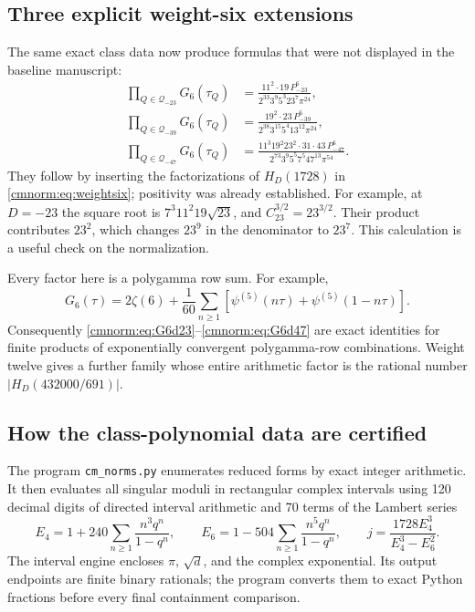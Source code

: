 \subsection{Three explicit weight-six extensions}

The same exact class data now produce formulas that were not displayed
in the baseline manuscript:
\begin{align}
 \prod_{Q\in\mathcal Q_{-23}}G_6(\tau_Q)
 &=\frac{11^2\cdot19\,P_{-23}^6}
       {2^{33}3^9 5^3 23^7\pi^{24}},\label{cmnorm:eq:G6d23}\\
 \prod_{Q\in\mathcal Q_{-39}}G_6(\tau_Q)
 &=\frac{19^2\cdot23\,P_{-39}^6}
       {2^{38}3^{15}5^4 13^{12}\pi^{24}},\label{cmnorm:eq:G6d39}\\
 \prod_{Q\in\mathcal Q_{-47}}G_6(\tau_Q)
 &=\frac{11^3 19^2 23^2\cdot31\cdot43\,P_{-47}^6}
       {2^{73}3^9 5^5 7^5 47^{13}\pi^{54}}.
       \label{cmnorm:eq:G6d47}
\end{align}
They follow by inserting the factorizations of $H_D(1728)$ in
\eqref{cmnorm:eq:weightsix}; positivity was already established.
For example, at $D=-23$ the square root is
$7^3 11^2 19\sqrt{23}$, and $C_{23}^{3/2}=23^{3/2}$.
Their product contributes $23^2$, which changes $23^9$ in the
denominator to $23^7$. This calculation is a useful check on the
normalization.

Every factor here is a polygamma row sum. For example,
\[
 G_6(\tau)=2\zeta(6)+\frac1{60}
  \sum_{n\geq1}\left[\psi^{(5)}(n\tau)
                         +\psi^{(5)}(1-n\tau)\right].
\]
Consequently \eqref{cmnorm:eq:G6d23}--\eqref{cmnorm:eq:G6d47}
are exact identities for finite products of exponentially convergent
polygamma-row combinations. Weight twelve gives a further family whose
entire arithmetic factor is the rational number
$|H_D(432000/691)|$.

\subsection{How the class-polynomial data are certified}
\label{cmnorm:sec:certification}

The program \texttt{cm\_norms.py} enumerates reduced forms by exact
integer arithmetic. It then evaluates all singular moduli in rectangular
complex intervals using 120 decimal digits of directed interval
arithmetic and 70 terms of the Lambert series
\[
 E_4=1+240\sum_{n\geq1}\frac{n^3q^n}{1-q^n},\qquad
 E_6=1-504\sum_{n\geq1}\frac{n^5q^n}{1-q^n},\qquad
 j=\frac{1728E_4^3}{E_4^3-E_6^2}.
\]
The interval engine encloses $\pi$, $\sqrt d$, and the complex
exponential. Its output endpoints are finite binary rationals; the
program converts them to exact Python fractions before every final
containment comparison.

